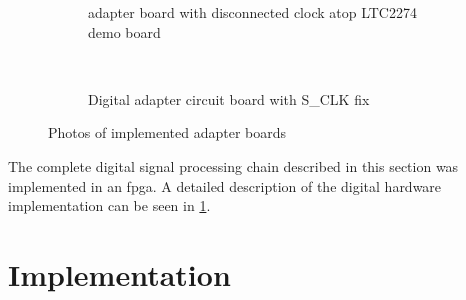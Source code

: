 \documentclass[12pt,a4paper,parskip=full,abstract=true,BCOR=12mm]{scrreprt}
\begin{document}
\begin{figure}[htb]
\begin{subfigure}[c]{.48\linewidth}
        \caption{ adapter board with disconnected clock atop LTC2274 demo board}
        \label{fig:adc_adapter_circ}
    \end{subfigure}%
    ~
    \begin{subfigure}[c]{.48\linewidth}
        \centering
        \caption{Digital  adapter circuit board with S\_CLK fix}
        \label{fig:iq_adapter_circ}
    \end{subfigure}
    \caption{Photos of implemented adapter boards}
    \label{fig:adapters}
\end{figure}

The complete digital signal processing chain described in this section was implemented
in an \gls{fpga}. A detailed description of the digital hardware implementation can
be seen in \cref{chap:fpga}.


\chapter{ Implementation}
\label{chap:fpga}
\end{document}
